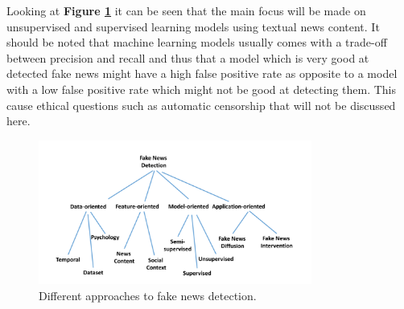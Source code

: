 Looking at \textbf{Figure \ref{fig:intro:features}} it can be seen that the main focus will be made on unsupervised and supervised learning models using textual news content. It should be noted that machine learning models usually comes with a trade-off between precision and recall and thus that a model which is very good at detected fake news might have a high false positive rate as opposite to a model with a low false positive rate which might not be good at detecting them. This cause ethical questions such as automatic censorship that will not be discussed here. 

\begin{figure}
 \centering
 \includegraphics[width=0.8\textwidth]{images/introduction/features}
 \caption{Different approaches to fake news detection.}
 \label{fig:intro:features}
\end{figure}
